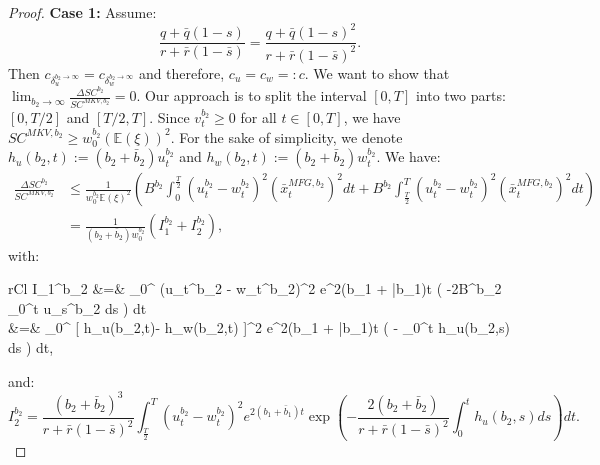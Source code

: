 \documentclass[11pt]{article}
\begin{document}
\begin{proof}
	\textbf{Case 1:} Assume:
	\begin{equation*}
	\frac{q+\bar{q}(1-s)}{r+\bar{r}(1-\bar{s})}=\frac{q+\bar{q}(1-s)^2}{r+\bar{r}(1-\bar{s})^2}.
	\end{equation*}
	Then $c_{\delta_u^{b_2 \to \infty}}=c_{\delta_w^{b_2 \to \infty}}$ and therefore, $c_u = c_w =: c$. 
	We want to show that $\lim_{b_2 \to \infty} \frac{\Delta SC^{b_2}}{SC^{MKV,b_2}} = 0$. Our approach is to split the interval $[0,T]$ into two parts: $[0,T/2]$ and $[T/2,T]$.	
	Since $v^{b_2}_t \geq 0$ for all $t\in [0,T]$, we have $SC^{MKV,b_2} \geq w_0^{b_2} (\mathbb{E}(\xi))^2$.	For the sake of simplicity, we denote $h_u(b_2,t) := (b_2 + \bar{b}_2) u_{t}^{b_2}$ and $h_w(b_2,t) := (b_2 + \bar{b}_2)w_t^{b_2}$. We have:
	\begin{equation}
	\begin{split}
		\frac{\Delta SC^{b_2}}{SC^{MKV,b_2}} &\leq \frac{1}{w_0^{b_2} \mathbb{E}(\xi)^2 } \left( B^{b_2} \int_{0}^{\frac{T}{2}} (u_t^{b_2} - w_t^{b_2})^2 (\bar{x}_t^{MFG,b_2})^2 dt + B^{b_2} \int_{\frac{T}{2}}^{T} (u_t^{b_2} - w_t^{b_2})^2 (\bar{x}_t^{MFG,b_2})^2 dt \right) \\ 
		&=  \frac{1}{(b_2 + \bar{b}_2) w_0^{b_2} } \left( I_1^{b_2} + I_2^{b_2} \right),
	\end{split}
	\label{eq:I_1_plus_I_2}
	\end{equation}
	with:
	\begin{IEEEeqnarray*}{rCl}
	I_1^{b_2} &=&   \int_0^{} (u_t^{b_2} - w_t^{b_2})^2 e^{2(b_1 + \bar{b}_1)t} \exp \left( -2B^{b_2} \int_0^{t} u_s^{b_2} ds 
	\right) dt \\
	&=&  \int_0^{} [ h_u(b_2,t)- h_w(b_2,t) ]^2 \cdot e^{2(b_1 + \bar{b}_1)t} \exp \left( -   \int_0^t h_u(b_2,s) ds \right) dt, 
	\end{IEEEeqnarray*}
	and:
	$$
		I_2^{b_2} = \frac{(b_2 + \bar{b}_2)^3}{r + \bar{r}(1-\bar{s})^2}  \int_{\frac{T}{2}}^T (u_t^{b_2} - w_t^{b_2})^2 e^{2(b_1 + \bar{b}_1)t} \exp \left( -\frac{2 (b_2 + \bar{b}_2)}{r + \bar{r}(1-\bar{s})^2} \int_0^{t} h_u(b_2,s) ds \right) dt.
	$$
	

\end{proof}
\end{document}
